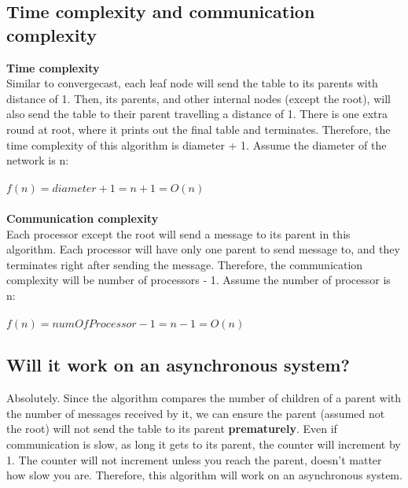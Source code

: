 \documentclass[12pt,letterpaper]{article}
\begin{document}
\subsection* {Time complexity and communication complexity}
\textbf{Time complexity} \\
Similar to convergecast, each leaf node will send the table to its parents with distance of 1. Then, its parents, and other internal nodes (except the root), will also send the table to their parent travelling a distance of 1. There is one extra round at root, where it prints out the final table and terminates. Therefore, the time complexity of this algorithm is diameter + 1. Assume the diameter of the network is n: \\ \\
$f(n) = diameter + 1 = n + 1 = O(n)$ \\ \\
\textbf{Communication complexity} \\
Each processor except the root will send a message to its parent in this algorithm. Each processor will have only one parent to send message to, and they terminates right after sending the message. Therefore, the communication complexity will be number of processors - 1. Assume the number of processor is n: \\ \\
$f(n) = numOfProcessor - 1 = n - 1 = O(n)$ \\

\subsection* {Will it work on an asynchronous system?}
Absolutely. Since the algorithm compares the number of children of a parent with the number of messages received by it, we can ensure the parent (assumed not the root) will not send the table to its parent \textbf{prematurely}. Even if communication is slow, as long it gets to its parent, the counter will increment by 1. The counter will not increment unless you reach the parent, doesn't matter how slow you are. Therefore, this algorithm will work on an asynchronous system.
\end{document}
